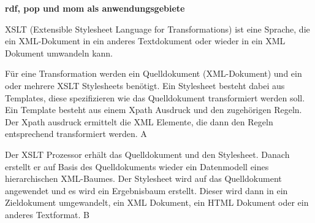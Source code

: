 \textbf{rdf, pop und mom als anwendungsgebiete}

XSLT (Extensible Stylesheet Language for Transformations) ist eine Sprache, die ein XML-Dokument in ein anderes Textdokument oder wieder in ein XML Dokument umwandeln kann.

Für eine Transformation werden ein Quelldokument (XML-Dokument) und ein oder mehrere XSLT Stylesheets benötigt. Ein Stylesheet besteht dabei aus Templates, diese spezifizieren wie das Quelldokument transformiert werden soll. Ein Template besteht aus einem Xpath Ausdruck und den zugehörigen Regeln. Der Xpath ausdruck ermittelt die XML Elemente, die dann den Regeln entsprechend transformiert werden. A

Der XSLT Prozessor erhält das Quelldokument und den Stylesheet. Danach erstellt er auf Basis des Quelldokuments wieder ein Datenmodell eines hierarchischen XML-Baumes. Der Stylesheet wird auf das Quelldokument angewendet und es wird ein Ergebnisbaum erstellt. Dieser wird dann in ein Zieldokument umgewandelt, ein XML Dokument, ein HTML Dokument oder ein anderes Textformat. B

